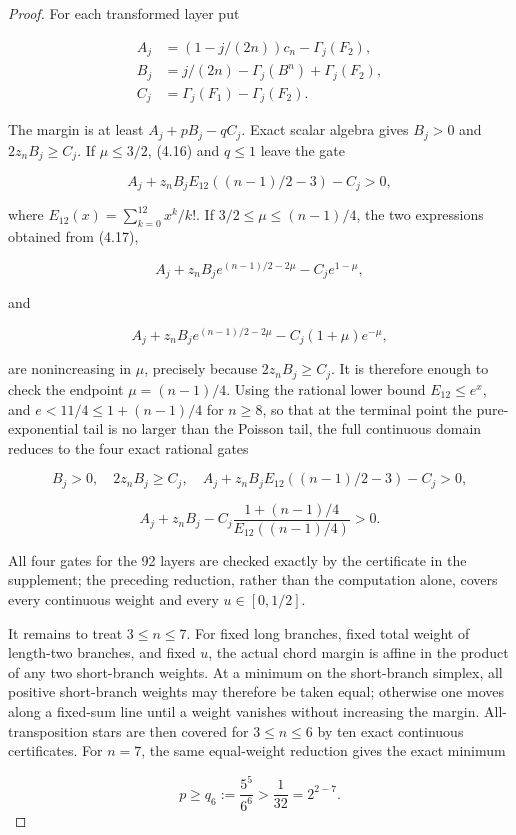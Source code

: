 \documentclass[11pt]{article}
\begin{document}
\begin{proof}
For each transformed layer put

\[
\begin{aligned}
A_j&=(1-j/(2n))c_n-\Gamma_j(F_2),\\
B_j&=j/(2n)-\Gamma_j(B^n)+\Gamma_j(F_2),\\
C_j&=\Gamma_j(F_1)-\Gamma_j(F_2).
\end{aligned} \tag{4.18}
\]

The margin is at least $A_j+pB_j-qC_j$.  Exact scalar algebra gives
$B_j>0$ and $2z_nB_j\ge C_j$.  If $\mu\le3/2$, (4.16) and
$q\le1$ leave the gate

\[
A_j+z_nB_jE_{12}((n-1)/2-3)-C_j>0,
\]

where $E_{12}(x)=\sum_{k=0}^{12}x^k/k!$.  If
$3/2\le\mu\le(n-1)/4$, the two expressions obtained from (4.17),

\[
 A_j+z_nB_je^{(n-1)/2-2\mu}-C_je^{1-\mu},
\]

and

\[
 A_j+z_nB_je^{(n-1)/2-2\mu}-C_j(1+\mu)e^{-\mu},
\]

are nonincreasing in $\mu$, precisely because
$2z_nB_j\ge C_j$.  It is therefore enough to check the endpoint
$\mu=(n-1)/4$.  Using the rational lower bound $E_{12}\le e^x$, and
$e<11/4\le1+(n-1)/4$ for $n\ge8$, so that at the terminal point the
pure-exponential tail is no larger than the Poisson tail,
the full continuous domain reduces to the four exact rational gates

\[
 B_j>0,\quad 2z_nB_j\ge C_j,\quad
 A_j+z_nB_jE_{12}((n-1)/2-3)-C_j>0,
\]

\[
 A_j+z_nB_j-C_j\frac{1+(n-1)/4}{E_{12}((n-1)/4)}>0. \tag{4.19}
\]

All four gates for the 92 layers are checked exactly by the certificate in
the supplement; the preceding reduction, rather than the computation alone,
covers every continuous weight and every $u\in[0,1/2]$.

It remains to treat $3\le n\le7$.  For fixed long branches, fixed
total weight of length-two branches, and fixed $u$, the actual chord
margin is affine in the product of any two short-branch weights.  At a
minimum on the short-branch simplex, all positive short-branch weights may
therefore be taken equal; otherwise one moves along a fixed-sum line until a
weight vanishes without increasing the margin.  All-transposition stars are
then covered for $3\le n\le6$ by ten exact continuous certificates.  For
$n=7$, the same equal-weight reduction gives the exact minimum

\[
 p\ge q_6:=\frac{5^5}{6^6}>\frac1{32}=2^{2-7}.
\]


\end{proof}
\end{document}
